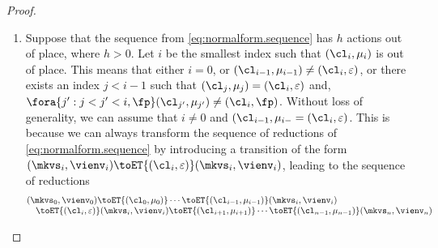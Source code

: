 \begin{proof}
\begin{enumerate}
\item Suppose that the sequence from \cref{eq:normalform.sequence} has $h$ actions out of place, 
where $h > 0$. Let $i$ be the smallest index such that $(\cl_{i}, \mu_{i})$ is out of place. 
This means that either $i = 0$, or $(\cl_{i-1}, \mu_{i-1}) \neq (\cl_{i}, \varepsilon)$, 
or there exists an index $j < i -1 $ such that $(\cl_{j}, \mu_{j}) = (\cl_{i}, \varepsilon)$ 
and, $\fora{ j': j < j' < i, \fp } (\cl_{j'}, \mu_{j'}) \neq (\cl_{i}, \fp)$. 
Without loss of generality, we can assume that $i \neq 0$ and $(\cl_{i-1}, \mu_{i-} = (\cl_{i}, \varepsilon)$. 
This is because we can always transform the sequence of reductions of \cref{eq:normalform.sequence} by 
introducing a transition of the form $(\mkvs_{i}, \vienv_{i}) \toET{(\cl_{i}, \varepsilon)}
(\mkvs_{i}, \vienv_{i})$, leading to the sequence of reductions
\[
\begin{array}{@{}l@{}}
(\mkvs_{0}, \vienv_{0}) \toET{(\cl_{0}, \mu_{0})} \cdots \toET{(\cl_{i-1}, \mu_{i-1})}
(\mkvs_{i}, \vienv_{i}) \\
\quad \toET{(\cl_{i}, \varepsilon)} (\mkvs_{i}, \vienv_{i}) \toET{(\cl_{i+1}, \mu_{i+1})}
\cdots \toET{(\cl_{n-1}, \mu_{n-1})} (\mkvs_{n}, \vienv_{n})
\end{array}
\]


\end{enumerate}
\end{proof}
